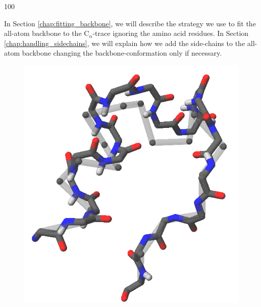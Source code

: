 \documentclass[a0,portrait]{a0poster}
\newcommand{\Ca}{C$_{\alpha}${}}
\begin{document}
\begin{GridBlock}{0}{21}{100}
\begin{multicols}{3}
In Section \ref{chap:fitting_backbone}, we will describe the strategy we use to fit the all-atom backbone to the \Ca-trace ignoring the amino acid residues.
In Section \ref{chap:handling_sidechains}, we will explain how we add the side-chains to the all-atom backbone changing the backbone-conformation only if necessary.

\begin{figure}
\vspace{-.8cm}
\includegraphics[width=.3\columnwidth]{../rapport/figures/forside.png}
\vspace{-3.5cm}
\end{figure}

\end{multicols}
\end{GridBlock}
\end{document}
